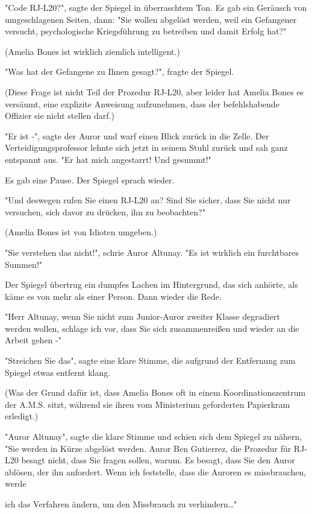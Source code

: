 {"Code RJ-L20?", sagte der Spiegel in überraschtem Ton. Es gab ein Geräusch von umgeschlagenen Seiten, dann: "Sie wollen abgelöst werden, weil ein Gefangener versucht, psychologische Kriegsführung zu betreiben und damit Erfolg hat?"

(Amelia Bones ist wirklich ziemlich intelligent.)

"Was hat der Gefangene zu Ihnen gesagt?", fragte der Spiegel.

(Diese Frage ist nicht Teil der Prozedur RJ-L20, aber leider hat Amelia Bones es versäumt, eine explizite Anweisung aufzunehmen, dass der befehlshabende Offizier sie nicht stellen darf.)

"Er ist -", sagte der Auror und warf einen Blick zurück in die Zelle. Der Verteidigungsprofessor lehnte sich jetzt in seinem Stuhl zurück und sah ganz entspannt aus. "Er hat mich angestarrt! Und gesummt!"

Es gab eine Pause. Der Spiegel sprach wieder.

"Und deswegen rufen Sie einen RJ-L20 an? Sind Sie sicher, dass Sie nicht nur versuchen, sich davor zu drücken, ihn zu beobachten?"

(Amelia Bones ist von Idioten umgeben.)

"Sie verstehen das nicht!", schrie Auror Altunay. "Es ist wirklich ein furchtbares Summen!"

Der Spiegel übertrug ein dumpfes Lachen im Hintergrund, das sich anhörte, als käme es von mehr als einer Person. Dann wieder die Rede.

"Herr Altunay, wenn Sie nicht zum Junior-Auror zweiter Klasse degradiert werden wollen, schlage ich vor, dass Sie sich zusammenreißen und wieder an die Arbeit gehen -"

"Streichen Sie das", sagte eine klare Stimme, die aufgrund der Entfernung zum Spiegel etwas entfernt klang.

(Was der Grund dafür ist, dass Amelia Bones oft in einem Koordinationszentrum der A.M.S. sitzt, während sie ihren vom Ministerium geforderten Papierkram erledigt.)

"Auror Altunay", sagte die klare Stimme und schien sich dem Spiegel zu nähern, "Sie werden in Kürze abgelöst werden. Auror Ben Gutierrez, die Prozedur für RJ-L20 besagt nicht, dass Sie fragen sollen, warum. Es besagt, dass Sie den Auror ablösen, der ihn anfordert. Wenn ich feststelle, dass die Auroren es missbrauchen, werde

ich das Verfahren ändern, um den Missbrauch zu verhindern…"

}
